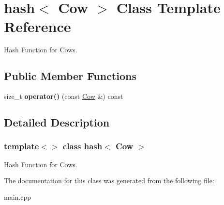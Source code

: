 \hypertarget{classhash_3_01_cow_01_4}{}\section{hash$<$ Cow $>$ Class Template Reference}
\label{classhash_3_01_cow_01_4}


Hash Function for Cows.  


\subsection*{Public Member Functions}
\begin{DoxyCompactItemize}
\item 
\mbox{\label{classhash_3_01_cow_01_4_a9b69ac601a813b95d26bda68654c0a5f}} 
size\+\_\+t {\bfseries operator()} (const \hyperlink{class_cow}{Cow} \&) const
\end{DoxyCompactItemize}


\subsection{Detailed Description}
\subsubsection*{template$<$$>$\newline
class hash$<$ Cow $>$}

Hash Function for Cows. 

The documentation for this class was generated from the following file\+:\begin{DoxyCompactItemize}
\item 
main.\+cpp\end{DoxyCompactItemize}

